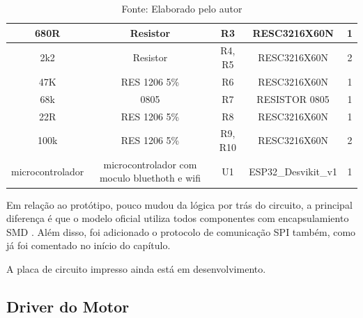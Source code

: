 \documentclass[../delivery_hospital_report.tex]{subfiles}
\begin{document}
\begin{table}[h]
\begin{adjustbox}{width=\columnwidth,center}
\begin{tabular}{|c|c|c|c|c|}
680R             & Resistor                                       & R3                         & RESC3216X60N             & 1        \\ \hline
2k2              & Resistor                                       & R4, R5                     & RESC3216X60N             & 2        \\ \hline
47K              & RES 1206 5\%                                   & R6                         & RESC3216X60N             & 1        \\ \hline
68k              & 0805                                           & R7                         & RESISTOR 0805            & 1        \\ \hline
22R              & RES 1206 5\%                                   & R8                         & RESC3216X60N             & 1        \\ \hline
100k             & RES 1206 5\%                                   & R9, R10                    & RESC3216X60N             & 2        \\ \hline
microcontrolador & microcontrolador com   moculo bluethoth e wifi & U1                         & ESP32\_Desvikit\_v1      & 1        \\ \hline

\end{tabular}
\end{adjustbox}
\centering
\caption*{Fonte: Elaborado pelo autor}
\label{Componentes Utilizados na placa de Controle}
\end{table}

Em relação ao protótipo, pouco mudou da lógica por trás do circuito, a principal diferença é que o modelo oficial utiliza todos componentes com encapsulamiento SMD \cite{SMD_def}. Além disso, foi adicionado o protocolo de comunicação SPI também, como já foi comentado no início do capítulo.

A placa de circuito impresso ainda está em desenvolvimento.

\subsection{Driver do Motor}
\end{document}
